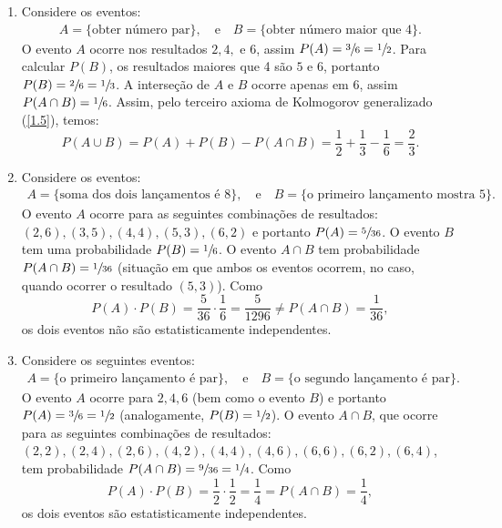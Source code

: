 \begin{enumerate}[label=\textbf{1.\arabic*.}]
\item Considere os eventos:
\begin{align*}
	A = \{ \text{obter número par} \}, \quad \text{e} \quad
	B = \{ \text{obter número maior que 4} \}.
\end{align*}
O evento $A$ ocorre nos resultados $2, 4,$ e $6$, assim $P(A) = \sfrac{3}{6}  = \sfrac{1}{2}$. Para calcular $P(B)$, os resultados maiores que 4 são $5$ e $6$, portanto $P(B) = \sfrac{2}{6} = \sfrac{1}{3}$. A interseção de $A$ e $B$ ocorre apenas em $6$, assim $P(A \cap B) = \sfrac{1}{6}$. Assim, pelo terceiro axioma de Kolmogorov generalizado (\autoref{1.5}), temos:
\begin{equation*}
P(A \cup B) = P(A) + P(B) - P(A \cap B) = \dfrac{1}{2} + \dfrac{1}{3} - \dfrac{1}{6} = \dfrac{2}{3}.
\end{equation*}

\item Considere os eventos:
\begin{align*}
	A = \{ \text{soma dos dois lançamentos é 8} \}, \quad \text{e} \quad
	B = \{ \text{o primeiro lançamento mostra 5} \}.
\end{align*}
O evento $A$ ocorre para as seguintes combinações de resultados: $(2,6), (3,5), (4,4), (5,3), (6,2)$ e portanto $P(A) = \sfrac{5}{36}$. O evento $B$ tem uma probabilidade $P(B) = \sfrac{1}{6}$. O evento $A \cap B$ tem probabilidade $P(A \cap B) = \sfrac{1}{36}$ (situação em que ambos os eventos ocorrem, no caso, quando ocorrer o resultado $(5,3)$). Como
\begin{equation*}
P(A) \cdot P(B) = \dfrac{5}{36} \cdot \dfrac{1}{6} = \dfrac{5}{1296} \neq P(A \cap B) = \dfrac{1}{36},
\end{equation*}
os dois eventos não são estatisticamente independentes.

\item Considere os seguintes eventos:
\begin{align*}
	A = \{ \text{o primeiro lançamento é par} \}, \quad \text{e} \quad
	B = \{ \text{o segundo lançamento é par} \}.
\end{align*}
O evento $A$ ocorre para $2,4,6$ (bem como o evento $B$) e portanto $P(A) = \sfrac{3}{6} = \sfrac{1}{2}$ (analogamente, $P(B) = \sfrac{1}{2}$). O evento $A \cap B$, que ocorre para as seguintes combinações de resultados: $(2,2), (2,4), (2,6), (4,2), (4,4), (4,6), (6,6), (6,2), (6,4)$, tem probabilidade $P(A \cap B) = \sfrac{9}{36} = \sfrac{1}{4}$. Como
\begin{equation*}
	P(A) \cdot P(B) = \dfrac{1}{2} \cdot \dfrac{1}{2} = \dfrac{1}{4} = P(A \cap B) = \dfrac{1}{4},
\end{equation*}
os dois eventos são estatisticamente independentes.


\end{enumerate}
